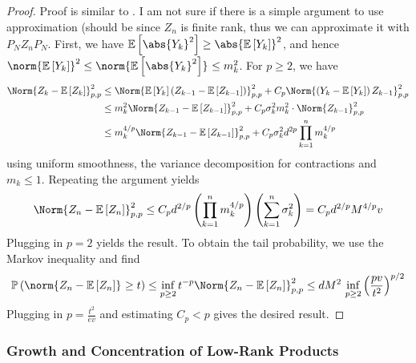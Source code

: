 \begin{proof}
  Proof is similar to \cite{huang2020matrix}. I am not sure if there is a simple argument to use approximation (should be since \( Z_n \) is finite rank, thus we can approximate it with \( P_NZ_nP_N \).
  First, we have \( \mathbb{E}\left[\abs{Y_k}^{2}\right] \geq \abs{\mathbb{E}\left[Y_k\right]}^{2} \), and hence \( \norm{\mathbb{E}\left[Y_k\right]}_{}^{2} \leq \norm{\mathbb{E}\left[\abs{Y_k}^{2}\right]}_{} \leq m_k^{2}\). For \( p \geq 2 \), we have 
  \begin{align*}
    \Norm{Z_k-\mathbb{E}\left[Z_k\right]}_{p,p}^{2} & \leq \Norm{\mathbb{E}\left[Y_k\right]\left(Z_{k-1}-\mathbb{E}\left[Z_{k-1}\right]\right)}_{p,p}^{2} + C_p \Norm{\left(Y_k-\mathbb{E}\left[Y_k\right]\right)Z_{k-1}}_{p,p}^{2} \\
                                                    & \leq m_k^{2} \Norm{Z_{k-1}-\mathbb{E}\left[Z_{k-1}\right]}_{p,p}^{2} + C_p \sigma_{k}^{2}m_k^{2} \cdot \Norm{Z_{k-1}}_{p,p}^{2} \\
                                                    & \leq m_{k}^{4/p} \Norm{Z_{k-1}-\mathbb{E}\left[Z_{k-1}\right]}_{p,p}^{2} + C_p \sigma_{k}^{2} d^{2p} \prod_{k=1}^{n} m_k^{4/p}
  \end{align*}
  using uniform smoothness, the variance decomposition for contractions and \( m_k \leq 1 \). Repeating the argument yields
  \[ \Norm{Z_{n}-\mathbb{E}\left[Z_n\right]}_{p,p}^{2} \leq C_p d^{2/p}\left(\prod_{k=1}^{n}m_k^{4/p}\right) \left(\sum_{k=1}^{n}\sigma_{k}^{2}\right)= C_pd^{2/p}M^{4/p}v\]
  Plugging in \( p=2 \) yields the result. To obtain the tail probability, we use the Markov inequality and find 
  \[ \mathbb{P}\left(\norm{Z_n-\mathbb{E}\left[Z_n\right]}_{}\geq t\right) \leq \inf_{p\geq 2} t^{-p}\Norm{Z_n-\mathbb{E}\left[Z_n\right]}_{p,p}^{2} \leq d M^{2} \, \inf_{p\geq 2}  \left(\frac{pv}{t^{2}}\right)^{p/2}\]
  Plugging in \( p= \frac{t^{2}}{ev} \) and estimating \( C_p <p \) gives the desired result.
\end{proof}


\subsubsection{Growth and Concentration of Low-Rank Products}


